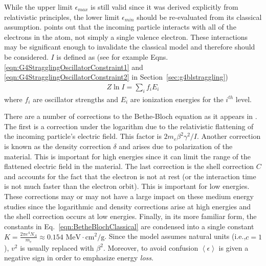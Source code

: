While the upper limit $\epsilon_{max}$ is still valid since it was derived explicitly from relativistic principles, the lower limit $\epsilon_{min}$ should be re-evaluated from its classical assumption. \cite{bichsel1968} points out that the incoming particle interacts with all of the electrons in the atom, not simply a single valence electron. These interactions may be significant enough to invalidate the classical model and therefore should be considered. $I$ is defined as (see for example Eqns. \ref{eqn:G4StragglingOscillatorConstraint1} and \ref{eqn:G4StragglingOscillatorConstraint2} in Section~\ref{sec:g4blstraggling})
\begin{gather*}
Z \ln I = \sum_i f_i E_i
\end{gather*}
where $f_i$ are oscillator strengths and $E_i$ are ionization energies for the $i^{th}$ level.
\fi

There are a number of corrections to the Bethe-Bloch equation as it appears in \cite{cosy}. The first is a correction under the logarithm due to the relativistic flattening of the incoming particle's electric field. This factor is  $2m_e \beta^2 \gamma^2 / I$\cite{cosy}. Another correction is known as the density correction $\delta$ and arises due to polarization of the material\cite{cosy}. This is important for high energies since it can limit the range of the flattened electric field in the material. The last correction is the shell correction $C$ and accounts for the fact that the electron is not at rest (or the interaction time is not much faster than the electron orbit)\cite{cosy}. This is important for low energies. These corrections may or may not have a large impact on these medium energy studies since the logarithmic and density corrections arise at high energies and the shell correction occurs at low energies. Finally, in its more familiar form, the constants in Eq.~\eqref{eqn:BetheBlochClassical} are condensed into a single constant $K=\frac{2\pi e^4 N_A}{m_e}\approx 0.154$ $ \text{MeV}\cdot \text{cm}^2/\text{g}$. Since the model assumes natural units (i.e.,$c=1$), $v^2$ is usually replaced with $\beta ^2$. Moreover, to avoid confusion $\left<\epsilon\right>$ is given a negative sign in order to emphasize energy \emph{loss}.

